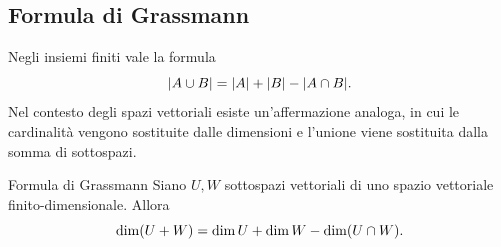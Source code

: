 \documentclass[a4paper]{article}
\begin{document}
\subsection{Formula di Grassmann}

Negli insiemi finiti vale la formula
\[
    |A\cup B|
    =
    |A|+|B|-|A\cap B|.
\]
Nel contesto degli spazi vettoriali esiste un'affermazione analoga, in cui le cardinalità vengono sostituite dalle dimensioni e l'unione viene sostituita dalla somma di sottospazi.

\begin{center}
\end{center}

\begin{snippettheorem}{Formula di Grassmann}
    Siano \(U,W\) sottospazi vettoriali di uno spazio vettoriale finito-dimensionale. Allora
    \[
        \dim(U+W)
        =
        \dim U+\dim W-\dim(U\cap W).
    \]
\end{snippettheorem}
\end{document}
